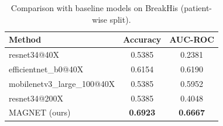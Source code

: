 \begin{table}[h]
\centering
\caption{Comparison with baseline models on BreakHis (patient-wise split).}
\begin{tabular}{lcc}
\hline
Method & Accuracy & AUC-ROC \\
\hline
  resnet34@40X & 0.5385 & 0.2381 \\
  efficientnet_b0@40X & 0.6154 & 0.6190 \\
  mobilenetv3_large_100@40X & 0.5385 & 0.5952 \\
  resnet34@200X & 0.5385 & 0.4048 \\
  MAGNET (ours) & \textbf{0.6923} & \textbf{0.6667} \\
\hline
\end{tabular}
\label{tab:comparison}
\end{table}